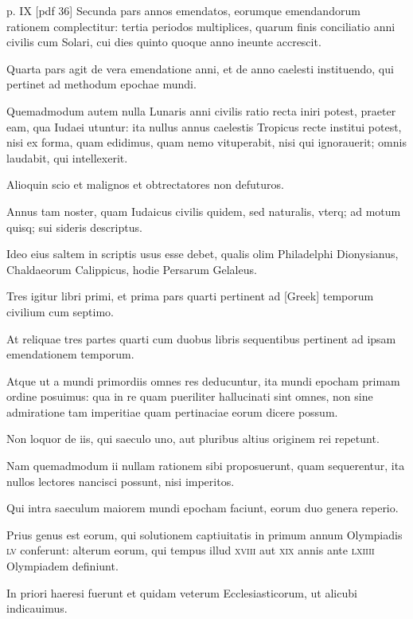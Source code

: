 \begin{parnumbers}
\clearpage
p. IX [pdf 36]
Secunda pars annos emendatos, eorumque emendandorum
rationem complectitur: tertia periodos multiplices, quarum finis
conciliatio anni civilis cum Solari, cui dies quinto quoque anno
ineunte accrescit.

Quarta pars agit de vera emendatione anni, et
de anno caelesti instituendo, qui pertinet ad methodum epochae
mundi.

Quemadmodum autem nulla Lunaris anni civilis ratio
recta iniri potest, praeter eam, qua Iudaei utuntur: ita nullus annus
caelestis Tropicus recte institui potest, nisi ex forma, quam edidimus,
quam nemo vituperabit, nisi qui ignorauerit; omnis laudabit,
qui intellexerit.

Alioquin scio et malignos et obtrectatores non defuturos. 

Annus tam noster, quam Iudaicus civilis quidem, sed naturalis,
vterq; ad motum quisq; sui sideris descriptus. 

Ideo eius saltem
in scriptis usus esse debet, qualis olim Philadelphi Dionysianus,
Chaldaeorum Calippicus, hodie Persarum Gelaleus. 

Tres igitur libri
primi, et prima pars quarti pertinent ad \textgreek{[Greek]} temporum civilium
cum septimo.

At reliquae tres partes quarti cum duobus libris
sequentibus pertinent ad ipsam emendationem temporum.

Atque
ut a mundi primordiis omnes res deducuntur, ita mundi epocham
primam ordine posuimus: qua in re quam pueriliter hallucinati sint
omnes, non sine admiratione tam imperitiae quam pertinaciae eorum
dicere possum.

Non loquor de iis, qui saeculo uno, aut pluribus altius
originem rei repetunt.

Nam quemadmodum ii nullam rationem
sibi proposuerunt, quam sequerentur, ita nullos lectores nancisci
possunt, nisi imperitos. 

Qui intra saeculum maiorem mundi
epocham faciunt, eorum duo genera reperio.

Prius genus est eorum,
qui solutionem captiuitatis in primum annum Olympiadis \textsc{lv} conferunt:
alterum eorum, qui tempus illud \textsc{xviii} aut \textsc{xix} annis ante
\textsc{lxiiii} Olympiadem definiunt.

In priori haeresi fuerunt et
quidam veterum Ecclesiasticorum, ut alicubi indicauimus. 


\end{parnumbers}

